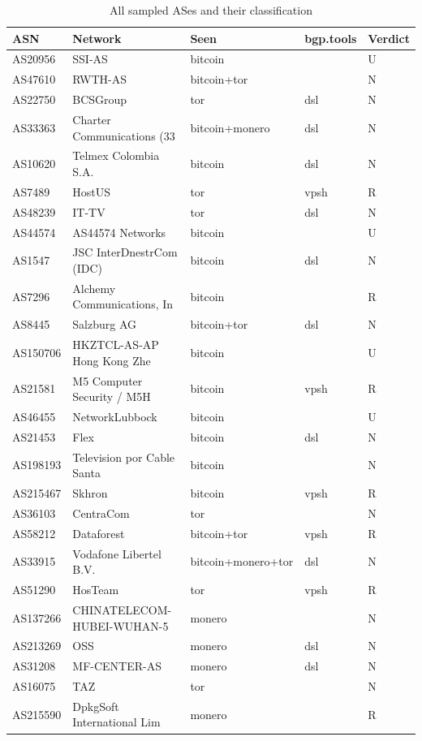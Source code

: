 \begingroup
\begin{longtable}{lllll}
\caption{
{\fontsize{20}{25}\selectfont  All sampled ASes and their classification}
} \\ 
\toprule
ASN & Network & Seen & bgp.tools & Verdict \\ 
\midrule\addlinespace[2.5pt]
AS20956 & SSI-AS & bitcoin &  & U \\ 
AS47610 & RWTH-AS & bitcoin+tor &  & N \\ 
AS22750 & BCSGroup & tor & dsl & N \\ 
AS33363 & Charter Communications (33 & bitcoin+monero & dsl & N \\ 
AS10620 & Telmex Colombia S.A. & bitcoin & dsl & N \\ 
AS7489 & HostUS & tor & vpsh & R \\ 
AS48239 & IT-TV & tor & dsl & N \\ 
AS44574 & AS44574 Networks & bitcoin &  & U \\ 
AS1547 & JSC InterDnestrCom (IDC) & bitcoin & dsl & N \\ 
AS7296 & Alchemy Communications, In & bitcoin &  & R \\ 
AS8445 & Salzburg AG & bitcoin+tor & dsl & N \\ 
AS150706 & HKZTCL-AS-AP Hong Kong Zhe & bitcoin &  & U \\ 
AS21581 & M5 Computer Security / M5H & bitcoin & vpsh & R \\ 
AS46455 & NetworkLubbock & bitcoin &  & U \\ 
AS21453 & Flex & bitcoin & dsl & N \\ 
AS198193 & Television por Cable Santa & bitcoin &  & N \\ 
AS215467 & Skhron & bitcoin & vpsh & R \\ 
AS36103 & CentraCom & tor &  & N \\ 
AS58212 & Dataforest & bitcoin+tor & vpsh & R \\ 
AS33915 & Vodafone Libertel B.V. & bitcoin+monero+tor & dsl & N \\ 
AS51290 & HosTeam & tor & vpsh & R \\ 
AS137266 & CHINATELECOM-HUBEI-WUHAN-5 & monero &  & N \\ 
AS213269 & OSS & monero & dsl & N \\ 
AS31208 & MF-CENTER-AS & monero & dsl & N \\ 
AS16075 & TAZ & tor &  & N \\ 
AS215590 & DpkgSoft International Lim & monero &  & R \\ 

\end{longtable}
